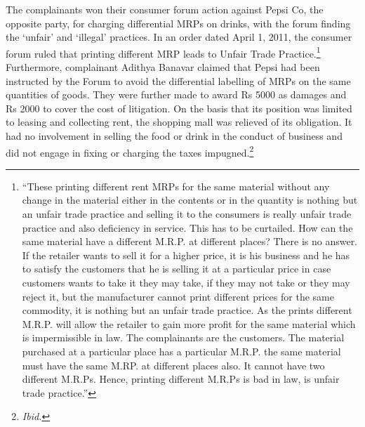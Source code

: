 \begin{multicols}{2}
\noi
The complainants won their consumer forum action against Pepsi Co, the opposite party, for
charging differential MRPs on drinks, with the forum finding the ‘unfair’ and ‘illegal’ practices.
In an order dated April 1, 2011, the consumer forum ruled that printing different MRP leads to
Unfair Trade Practice.\footnote{“These printing different rent MRPs for the same material without any change in the material either in the contents or in the quantity is nothing but an unfair trade practice and selling it to the consumers is really unfair trade practice and also deficiency in service. This has to be curtailed. How can the same material have a different M.R.P. at different places? There is no answer. If the retailer wants to sell it for a higher price, it is his business and he has to satisfy the customers that he is selling it at a particular price in case customers wants to take it they may take, if they may not take or they may reject it, but the manufacturer cannot print different prices for the same commodity, it is nothing but an unfair trade practice. As the prints different M.R.P. will allow the retailer to gain more profit for the same material which is impermissible in law. The complainants are the customers. The material purchased at a particular place has a particular M.R.P. the same material must have the same M.RP. at different places also. It cannot have two different M.R.Ps. Hence, printing different M.R.Ps is bad in law, is unfair trade practice.”} Furthermore, complainant Adithya Banavar claimed that Pepsi had been instructed by the Forum to avoid the differential labelling of MRPs on the same quantities of goods. They were further made to award Rs 5000 as damages and Rs 2000 to cover the cost of litigation. On the basis that its position was limited to leasing and collecting rent, the shopping mall was relieved of its obligation. It had no involvement in selling the food or drink in the conduct of business and did not engage in fixing or charging the taxes impugned.\footnote{\textit{Ibid.}}

\vspace{-.15cm}


\end{multicols}
